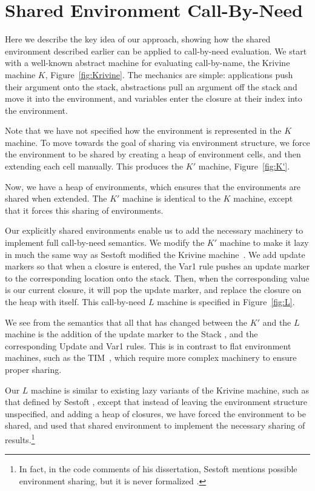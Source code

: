 \documentclass[preprint]{sigplanconf}
\begin{document}
\section{Shared Environment Call-By-Need} \label{sec:calc}

Here we describe the key idea of our approach, showing how
the shared environment described earlier can be applied to call-by-need
evaluation. We start with a well-known abstract machine for evaluating
call-by-name, the Krivine machine $K$, Figure~\ref{fig:Krivine}.
The mechanics are simple: applications push their argument onto the stack,
abstractions pull an argument off the stack and move it into the environment,
and variables enter the closure at their index into the environment.



Note that we have not specified how the environment is represented in the $K$
machine. To move towards the goal of sharing via environment structure,
we force the environment to be shared by creating a heap of environment
cells, and then extending each cell manually. This produces the $K'$ machine,
Figure~\ref{fig:K'}.



Now, we have a heap of environments, which ensures that the
environments are shared when extended.  The $K'$ machine is identical to the $K$
machine, except that it forces this sharing of environments. 

Our explicitly shared environments enable us to add the necessary
machinery to implement full call-by-need semantics. We modify the $K'$ machine
to make it lazy in much the same way as Sestoft modified the Krivine
machine~\cite{sestoft}. We add update markers so that when a closure is entered,
the Var1 rule pushes an update marker to the corresponding location onto the
stack.  Then, when the corresponding value is our current closure, it will pop
the update marker, and replace the closure on the heap with itself. This
call-by-need $L$ machine is specified in Figure~\ref{fig:L}.



We see from the semantics that all that has changed between the $K'$ and the
$L$ machine is the addition of the update marker to the Stack 
, and the corresponding Update and Var1 rules. This is in contrast to flat
environment machines, such as the TIM~\cite{TIM}, which require more complex
machinery to ensure proper sharing.

Our $L$ machine is similar to existing lazy variants of the Krivine machine,
such as that defined by Sestoft \cite{sestoft}, except that instead of leaving
the environment structure unspecified, and adding a heap of closures, we have
forced the environment to be shared, and used that shared environment to
implement the necessary sharing of results.\footnote{In fact, in the code
comments of his dissertation, Sestoft mentions possible environment sharing, but
it is never formalized \cite{sestoft91analysis}.} 
\end{document}
